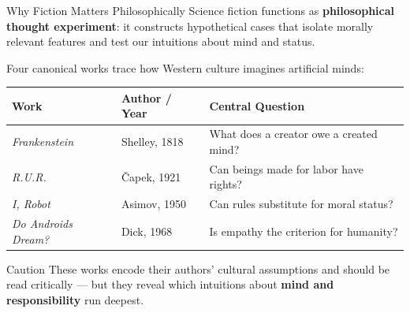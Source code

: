 \documentclass[aspectratio=169,11pt]{beamer}
\begin{document}
\begin{frame}[shrink=3]{Why Fiction Matters Philosophically}
Science fiction functions as \textbf{philosophical thought experiment}: it constructs hypothetical cases that isolate morally relevant features and test our intuitions about mind and status.

\vspace{0.2cm}
Four canonical works trace how Western culture imagines artificial minds:

\vspace{0.1cm}
\begin{tabular}{@{}p{3.0cm}p{3.5cm}p{5.5cm}@{}}
\toprule
\textbf{Work} & \textbf{Author / Year} & \textbf{Central Question} \\
\midrule
\emph{Frankenstein} & Shelley, 1818 & What does a creator owe a created mind? \\
\emph{R.U.R.} & \v{C}apek, 1921 & Can beings made for labor have rights? \\
\emph{I, Robot} & Asimov, 1950 & Can rules substitute for moral status? \\
\emph{Do Androids Dream?} & Dick, 1968 & Is empathy the criterion for humanity? \\
\bottomrule
\end{tabular}

\vspace{0.2cm}
\begin{alertblock}{Caution}
\scriptsize
These works encode their authors' cultural assumptions and should be read critically --- but they reveal which intuitions about \textbf{mind and responsibility} run deepest.
\end{alertblock}
\end{frame}
\end{document}
